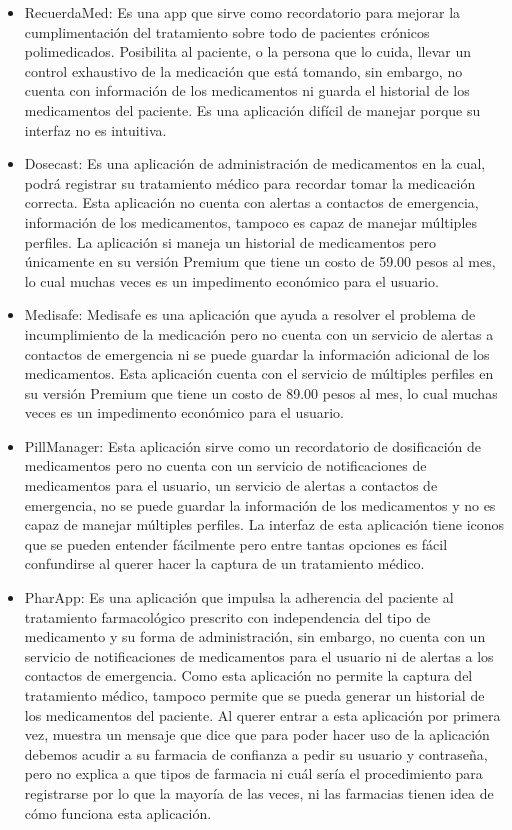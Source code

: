 \begin{itemize}
	\item RecuerdaMed: Es una app que sirve como recordatorio para mejorar la cumplimentación del tratamiento sobre todo de pacientes crónicos polimedicados. Posibilita al paciente, o la persona que lo cuida, llevar un control exhaustivo de la medicación que está tomando, sin embargo, no cuenta con información de los medicamentos ni guarda el historial de los medicamentos del paciente. Es una aplicación difícil de manejar porque su interfaz no es intuitiva.

	\item Dosecast: Es una aplicación de administración de medicamentos en la cual, podrá registrar su tratamiento médico para recordar tomar la medicación correcta. Esta aplicación no cuenta con alertas a contactos de emergencia, información de los medicamentos, tampoco es capaz de manejar múltiples perfiles. La aplicación si maneja un historial de medicamentos pero únicamente en su versión Premium que tiene un costo de 59.00 pesos al mes, lo cual muchas veces es un impedimento económico para el usuario.

	\item Medisafe: Medisafe es una aplicación que ayuda a resolver el problema de incumplimiento de la medicación pero no cuenta con un servicio de alertas a contactos de emergencia ni se puede guardar la información adicional de los medicamentos. Esta aplicación cuenta con el servicio de múltiples perfiles en su versión Premium que tiene un costo de 89.00 pesos al mes, lo cual muchas veces es un impedimento económico para el usuario.
	
	\item PillManager: Esta aplicación sirve como un recordatorio de dosificación de medicamentos pero no cuenta con un servicio de notificaciones de medicamentos para el usuario, un servicio de alertas a contactos de emergencia, no se puede guardar la información de los medicamentos y no es capaz de manejar múltiples perfiles. La interfaz de esta aplicación tiene iconos que se pueden entender fácilmente pero entre tantas opciones es fácil confundirse al querer hacer la captura de un tratamiento médico.

	\item PharApp: Es una aplicación que impulsa la adherencia del paciente al tratamiento farmacológico prescrito con independencia del tipo de medicamento y su forma de administración, sin embargo, no cuenta con un servicio de notificaciones de medicamentos para el usuario ni de alertas a los contactos de emergencia. Como esta aplicación no permite la captura del tratamiento médico, tampoco permite que se pueda generar un historial de los medicamentos del paciente. Al querer entrar a esta aplicación por primera vez, muestra un mensaje que dice que para poder hacer uso de la aplicación debemos acudir a su farmacia de confianza a pedir su usuario y contraseña, pero no explica a que tipos de farmacia ni cuál sería el procedimiento para registrarse por lo que la mayoría de las veces, ni las farmacias tienen idea de cómo funciona esta aplicación.
	

\end{itemize}
